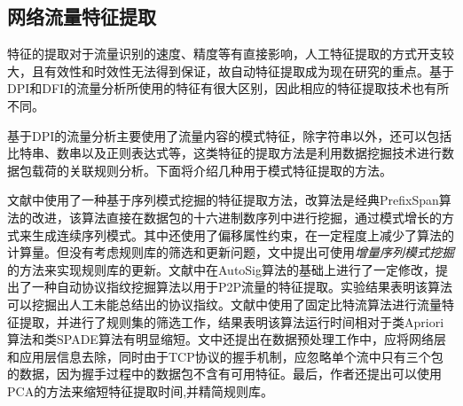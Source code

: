 \documentclass[a4papper]{article}
\begin{document}
\subsection{网络流量特征提取}
\par\setlength{\parindent}{2em} %
特征的提取对于流量识别的速度、精度等有直接影响，人工特征提取的方式开支较大，且有效性和时效性无法得到保证，故自动特征提取成为现在研究的重点。基于DPI和DFI的流量分析所使用的特征有很大区别，因此相应的特征提取技术也有所不同。
\par\setlength{\parindent}{2em} %
基于DPI的流量分析主要使用了流量内容的模式特征，除字符串以外，还可以包括比特串、数串以及正则表达式等，这类特征的提取方法是利用数据挖掘技术进行数据包载荷的关联规则分析。下面将介绍几种用于模式特征提取的方法。
\par\setlength{\parindent}{2em} %
文献\cite{林冠洲2011网络流量识别关键技术研究}中使用了一种基于序列模式挖掘的特征提取方法，改算法是经典PrefixSpan算法的改进，该算法直接在数据包的十六进制数序列中进行挖掘，通过模式增长的方式来生成连续序列模式。其中还使用了偏移属性约束，在一定程度上减少了算法的计算量。但没有考虑规则库的筛选和更新问题，文中提出可使用\emph{增量序列模式挖掘}的方法来实现规则库的更新。文献\cite{马婧2012网络流量特征提取与流量识别研究}中在AutoSig算法的基础上进行了一定修改，提出了一种自动协议指纹挖掘算法以用于P2P流量的特征提取。实验结果表明该算法可以挖掘出人工未能总结出的协议指纹。文献\cite{牟澄2014互联网流量特征智能提取关键技术研究}中使用了固定比特流算法进行流量特征提取，并进行了规则集的筛选工作，结果表明该算法运行时间相对于类Apriori算法和类SPADE算法有明显缩短。文中还提出在数据预处理工作中，应将网络层和应用层信息去除，同时由于TCP协议的握手机制，应忽略单个流中只有三个包的数据，因为握手过程中的数据包不含有可用特征。最后，作者还提出可以使用PCA的方法来缩短特征提取时间,并精简规则库。
\end{document}
